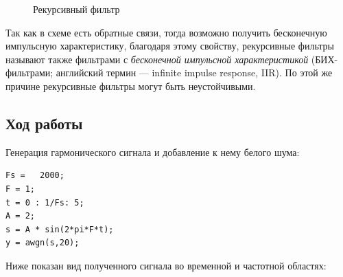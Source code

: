 \documentclass[a4paper,14pt]{article}
\begin{document}
\begin{figure}[bh]
\noindent{}
\caption{Рекурсивный фильтр}
\label{figCurves}
\end{figure}

Так как в схеме есть обратные связи, тогда возможно получить бесконечную импульсную характеристику, благодаря этому свойству, рекурсивные фильтры называют также фильтрами с
\textit{бесконечной импульсной характеристикой} (БИХ-фильтрами; английский термин — infinite impulse response, IIR). По этой же причине рекурсивные фильтры могут быть неустойчивыми.
\newpage
\subsection{Ход работы}

Генерация гармонического сигнала и добавление к нему белого шума:
\begin{lstlisting}
Fs =   2000;
F = 1;
t = 0 : 1/Fs: 5; 
A = 2; 
s = A * sin(2*pi*F*t);	
y = awgn(s,20); 		
\end{lstlisting}

\hspace{0,5cm}Ниже показан вид полученного сигнала во временной и частотной областях:
\end{document}
